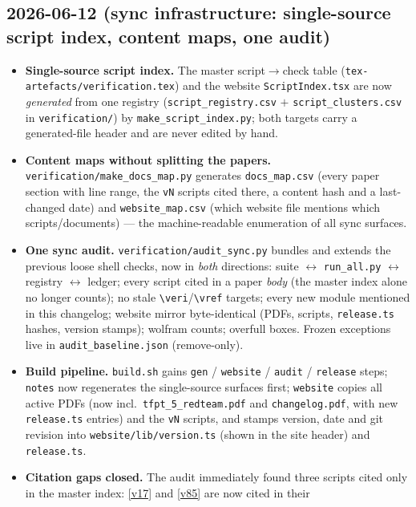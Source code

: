 \subsection*{2026-06-12 (sync infrastructure: single-source script index, content maps, one audit)}
\begin{itemize}
\item \textbf{Single-source script index.} The master script$\to$check table
  (\texttt{tex-artefacts/verification.tex}) and the website
  \texttt{ScriptIndex.tsx} are now \emph{generated} from one registry
  (\texttt{script\_registry.csv} $+$ \texttt{script\_clusters.csv} in
  \texttt{verification/}) by \texttt{make\_script\_index.py}; both targets carry a
  generated-file header and are never edited by hand.
\item \textbf{Content maps without splitting the papers.}
  \texttt{verification/make\_docs\_map.py} generates \texttt{docs\_map.csv} (every
  paper section with line range, the \texttt{vN} scripts cited there, a content hash
  and a last-changed date) and \texttt{website\_map.csv} (which website file mentions
  which scripts/documents) --- the machine-readable enumeration of all sync surfaces.
\item \textbf{One sync audit.} \texttt{verification/audit\_sync.py} bundles and
  extends the previous loose shell checks, now in \emph{both} directions: suite
  $\leftrightarrow$ \texttt{run\_all.py} $\leftrightarrow$ registry
  $\leftrightarrow$ ledger; every script cited in a paper \emph{body} (the master
  index alone no longer counts); no stale \texttt{\textbackslash veri}/\texttt{\textbackslash vref}
  targets; every new module mentioned in this changelog; website mirror byte-identical
  (PDFs, scripts, \texttt{release.ts} hashes, version stamps); wolfram counts; overfull
  boxes. Frozen exceptions live in \texttt{audit\_baseline.json} (remove-only).
\item \textbf{Build pipeline.} \texttt{build.sh} gains \texttt{gen} /
  \texttt{website} / \texttt{audit} / \texttt{release} steps; \texttt{notes} now
  regenerates the single-source surfaces first; \texttt{website} copies all active
  PDFs (now incl.\ \texttt{tfpt\_5\_redteam.pdf} and \texttt{changelog.pdf}, with new
  \texttt{release.ts} entries) and the \texttt{vN} scripts, and stamps version, date
  and git revision into \texttt{website/lib/version.ts} (shown in the site header) and
  \texttt{release.ts}.
\item \textbf{Citation gaps closed.} The audit immediately found three scripts cited
  only in the master index: \vref{v17} and \vref{v85} are now cited in their

\end{itemize}
